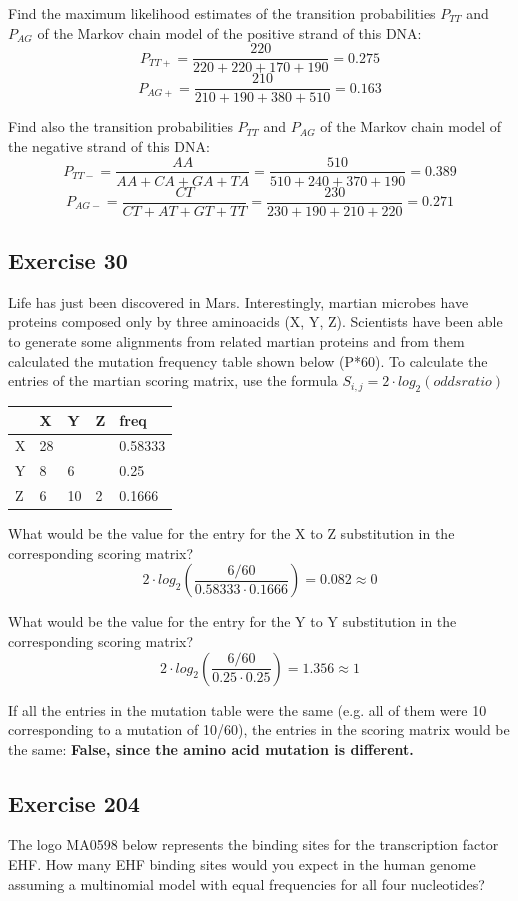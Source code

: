 Find the maximum likelihood estimates of the transition probabilities $P_{TT}$ and $P_{AG}$ of the Markov chain model of the positive strand of this DNA:
$$P_{TT+} = \frac{220}{220+220+170+190} = 0.275$$
$$P_{AG+} = \frac{210}{210+190+380+510} = 0.163$$

Find also the transition probabilities $P_{TT}$ and $P_{AG}$ of the Markov chain model of the negative strand of this DNA:
$$P_{TT-} = \frac{AA}{AA + CA + GA + TA} = \frac{510}{510+240+370+190} = 0.389$$
$$P_{AG-} = \frac{CT}{CT + AT + GT + TT} = \frac{230}{230+190+210+220} = 0.271$$

\subsection{Exercise 30}
Life has just been discovered in Mars. Interestingly, martian microbes have proteins composed only by three aminoacids (X, Y, Z). Scientists have been able to generate some alignments from related martian proteins and from them calculated the mutation frequency table shown below (P*60). To calculate the entries of the martian scoring matrix, use the formula $S_{i,j} = 2 \cdot log_2(odds ratio)$

\begin{table}[htbp]
\centering
\begin{tabular}{l l l l || l }
& X & Y & Z & freq \\ \hline
X & 28 &  &  & 0.58333 \\
Y & 8 & 6 &  & 0.25 \\
Z & 6 & 10 & 2 & 0.1666 \\
\end{tabular}
\end{table}

What would be the value for the entry for the X to Z substitution in the corresponding scoring matrix?
$$2 \cdot log_2(\frac{6/60}{0.58333 \cdot 0.1666}) = 0.082 \approx 0$$

What would be the value for the entry for the Y to Y substitution in the corresponding scoring matrix?
$$2 \cdot log_2(\frac{6/60}{0.25 \cdot 0.25}) = 1.356 \approx 1$$

If all the entries in the mutation table were the same (e.g. all of them were 10 corresponding to a mutation of 10/60), the entries in the scoring matrix would be the same: \textbf{False, since the amino acid mutation is different.}

\subsection{Exercise 204}
The logo MA0598 below represents the binding sites for the transcription factor EHF. How many EHF binding sites would you expect in the human genome assuming a multinomial model with equal frequencies for all four nucleotides?

